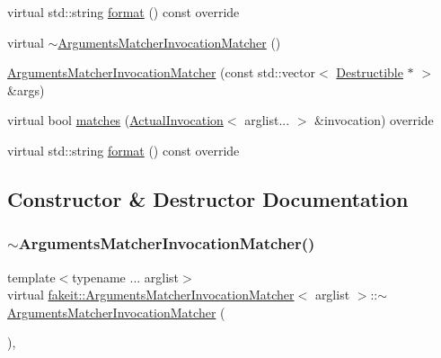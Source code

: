 \begin{DoxyCompactItemize}
virtual std\+::string \mbox{\hyperlink{structfakeit_1_1ArgumentsMatcherInvocationMatcher_a5174a0a696bbbc3090b4b1d7937c02f9}{format}} () const override
\item 
virtual \mbox{\hyperlink{structfakeit_1_1ArgumentsMatcherInvocationMatcher_a7674a20f37f1b19f7597eb24d9deb392}{$\sim$\+Arguments\+Matcher\+Invocation\+Matcher}} ()
\item 
\mbox{\hyperlink{structfakeit_1_1ArgumentsMatcherInvocationMatcher_aad6c81f17ede575178414c2c7581e800}{Arguments\+Matcher\+Invocation\+Matcher}} (const std\+::vector$<$ \mbox{\hyperlink{classfakeit_1_1Destructible}{Destructible}} $\ast$ $>$ \&args)
\item 
virtual bool \mbox{\hyperlink{structfakeit_1_1ArgumentsMatcherInvocationMatcher_a7da0c96fb549a6bb4b944214514e4ca8}{matches}} (\mbox{\hyperlink{structfakeit_1_1ActualInvocation}{Actual\+Invocation}}$<$ arglist... $>$ \&invocation) override
\item 
virtual std\+::string \mbox{\hyperlink{structfakeit_1_1ArgumentsMatcherInvocationMatcher_a5174a0a696bbbc3090b4b1d7937c02f9}{format}} () const override
\end{DoxyCompactItemize}


\subsection{Constructor \& Destructor Documentation}
\mbox{\label{structfakeit_1_1ArgumentsMatcherInvocationMatcher_a7674a20f37f1b19f7597eb24d9deb392}} 
\subsubsection{\texorpdfstring{$\sim$ArgumentsMatcherInvocationMatcher()}{~ArgumentsMatcherInvocationMatcher()}\hspace{0.1cm}{\footnotesize\ttfamily [1/9]}}
{\footnotesize\ttfamily template$<$typename ... arglist$>$ \\
virtual \mbox{\hyperlink{structfakeit_1_1ArgumentsMatcherInvocationMatcher}{fakeit\+::\+Arguments\+Matcher\+Invocation\+Matcher}}$<$ arglist $>$\+::$\sim$\mbox{\hyperlink{structfakeit_1_1ArgumentsMatcherInvocationMatcher}{Arguments\+Matcher\+Invocation\+Matcher}} (\begin{DoxyParamCaption}{ }\end{DoxyParamCaption})\hspace{0.3cm}{\ttfamily [inline]}, {\ttfamily [virtual]}}

